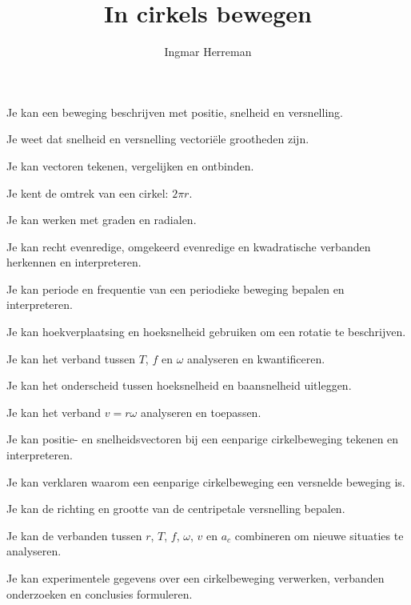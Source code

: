 \documentclass{ximera}
\title{In cirkels bewegen}
\author{Ingmar Herreman}
\begin{document}





\maketitle


\begin{voorkennis}
  \item Je kan een beweging beschrijven met positie, snelheid en versnelling.
  \item Je weet dat snelheid en versnelling vectoriële grootheden zijn.
  \item Je kan vectoren tekenen, vergelijken en ontbinden.
  \item Je kent de omtrek van een cirkel: $2\pi r$.
  \item Je kan werken met graden en radialen.
  \item Je kan recht evenredige, omgekeerd evenredige en kwadratische
        verbanden herkennen en interpreteren.
\end{voorkennis}

\begin{leerdoelen}
  \item Je kan periode en frequentie van een periodieke beweging bepalen
        en interpreteren.
  \item Je kan hoekverplaatsing en hoeksnelheid gebruiken om een rotatie
        te beschrijven.
  \item Je kan het verband tussen $T$, $f$ en $\omega$ analyseren en
        kwantificeren.
  \item Je kan het onderscheid tussen hoeksnelheid en baansnelheid uitleggen.
  \item Je kan het verband $v=r\omega$ analyseren en toepassen.
  \item Je kan positie- en snelheidsvectoren bij een eenparige
        cirkelbeweging tekenen en interpreteren.
  \item Je kan verklaren waarom een eenparige cirkelbeweging een versnelde
        beweging is.
  \item Je kan de richting en grootte van de centripetale versnelling
        bepalen.
  \item Je kan de verbanden tussen $r$, $T$, $f$, $\omega$, $v$ en $a_c$
        combineren om nieuwe situaties te analyseren.
  \item Je kan experimentele gegevens over een cirkelbeweging verwerken,
        verbanden onderzoeken en conclusies formuleren.
\end{leerdoelen}
\end{document}

